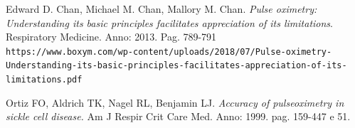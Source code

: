 \documentclass[12pt,a4paper, twoside, openright]{report}
\begin{document}
\thispagestyle{empty}
\newpage
\thispagestyle{empty}

\begin{thebibliography}{1}
Edward D. Chan, Michael M. Chan, Mallory M. Chan. 
\textit{Pulse oximetry: Understanding its basic principles facilitates appreciation of its limitations}. 
Respiratory Medicine. Anno: 2013. Pag. 789-791
\\\texttt{https://www.boxym.com/wp-content/uploads/2018/07/Pulse-oximetry-Understanding-its-basic-principles-facilitates-appreciation-of-its-limitations.pdf}

Ortiz FO, Aldrich TK, Nagel RL, Benjamin LJ.
\textit{Accuracy of pulseoximetry in sickle cell disease.}
Am J Respir Crit Care Med. Anno: 1999. pag. 159-447 e 51.












\end{thebibliography}
\end{document}
